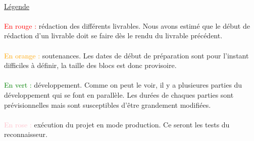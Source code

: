 \paragraph{}
\underline{Légende}

\paragraph{}
\textcolor{red}{En rouge : } rédaction des différents livrables. Nous avons estimé que le début de rédaction d’un livrable doit se faire dès le rendu du livrable précédent.

\paragraph{}
\textcolor{orange}{En orange : } soutenances. Les dates de début de préparation sont pour l’instant difficiles à définir, la taille des blocs est donc provisoire.

\paragraph{}
\textcolor{green}{En vert : } développement. Comme on peut le voir, il y a plusieures parties du développement qui se font en parallèle. Les durées de chaques parties sont prévisionnelles mais sont susceptibles d’être grandement modifiées.

\paragraph{}
\textcolor{pink}{En rose : } exécution du projet en mode production. Ce seront les tests du reconnaisseur.